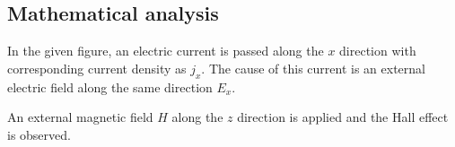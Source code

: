 \subsection{Mathematical analysis}

In the given figure, an electric current is passed along the $ x $ direction with corresponding current density as $ j_x $. The cause of this current is an external electric field along the same direction $ E_x $.

An external magnetic field $ H $ along the $ z $ direction is applied and the Hall effect is observed.


